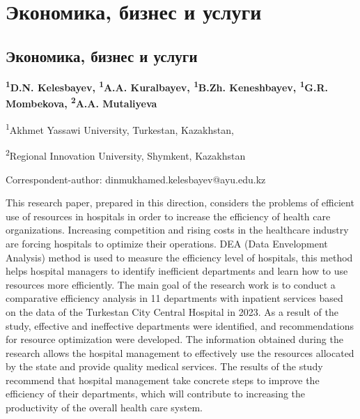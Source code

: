 \newpage
\let\cleardoublepage\clearpage
\part{Экономика, бизнес и услуги}
\let\cleardoublepage\clearpage
\chapter{Экономика, бизнес и услуги}

\begin{articleheader}

{\bfseries
\textsuperscript{1}D.N. Kelesbayev\textsuperscript{\envelope },
\textsuperscript{1}A.A. Kuralbayev,
\textsuperscript{1}B.Zh. Keneshbayev,
\textsuperscript{1}G.R. Mombekova,
\textsuperscript{2}A.A. Mutaliyeva
}
\end{articleheader}

\begin{affiliation}
\textsuperscript{1}Akhmet Yassawi University, Turkestan, Kazakhstan,

\textsuperscript{2}Regional Innovation University, Shymkent, Kazakhstan

\raggedright \textsuperscript{\envelope }Correspondent-author: dinmukhamed.kelesbayev@ayu.edu.kz
\end{affiliation}

This research paper, prepared in this direction, considers the problems
of efficient use of resources in hospitals in order to increase the
efficiency of health care organizations. Increasing competition and
rising costs in the healthcare industry are forcing hospitals to
optimize their operations. DEA (Data Envelopment Analysis) method is
used to measure the efficiency level of hospitals, this method helps
hospital managers to identify inefficient departments and learn how to
use resources more efficiently. The main goal of the research work is to
conduct a comparative efficiency analysis in 11 departments with
inpatient services based on the data of the Turkestan City Central
Hospital in 2023. As a result of the study, effective and ineffective
departments were identified, and recommendations for resource
optimization were developed. The information obtained during the
research allows the hospital management to effectively use the resour\-ces
allocated by the state and provide quality medical services. The results
of the study recommend that hospital management take concrete steps to
improve the efficiency of their departments, which will contrib\-ute to
increasing the productivity of the overall health care system.


